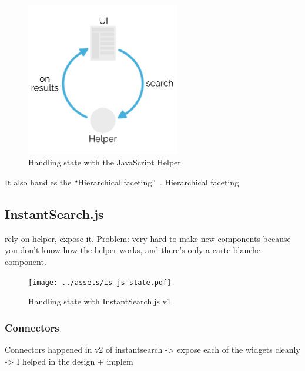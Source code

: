 \begin{figure}[H]
\label{figure:js-helper-state}
  \centering
  \includegraphics[width=0.6\textwidth]{../assets/helper-cycle.pdf}
  \caption{Handling state with the JavaScript Helper\cite{js-helper-concepts}}
\end{figure}

It also handles the ``Hierarchical faceting''\cite{hierarchical-faceting}~. Hierarchical faceting %


\subsection{InstantSearch.js} %
\label{sub:instantsearch_js}

rely on helper, expose it. Problem: very hard to make new components because you don't know how the helper works, and there's only a carte blanche component. %

\begin{figure}[H]
\label{figure:is-js-state}
  \centering
  \texttt{[image: ../assets/is-js-state.pdf]}
  \caption{Handling state with InstantSearch.js v1}
\end{figure}

\subsubsection{Connectors} %
\label{ssub:instantsearch_js_connectors}

Connectors happened in v2 of instantsearch
-> expose each of the widgets cleanly
-> I helped in the design + implem %


